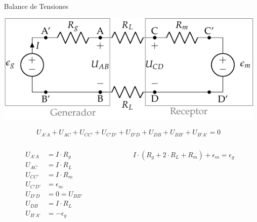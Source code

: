 \documentclass[aspectratio=169, usenames,svgnames,dvipsnames]{beamer}
\begin{document}
\begin{frame}[label={sec:org0779901}]{Balance de Tensiones}
\begin{center}
\includegraphics[height=0.25\textheight]{../figs/circuito_lkv.pdf}
\end{center}
\begin{equation*}
  U_{A'A} + U_{AC} + U_{CC'} + U_{C'D'} + U_{D'D} + U_{DB} + U_{BB'} + U_{B'A'} = 0
\end{equation*}
\begin{columns}
\begin{column}{0.3\columnwidth}
\begin{align*}
  U_{A'A} &= I \cdot R_g\\
  U_{AC} &= I \cdot R_L\\
  U_{CC'} &= I \cdot R_m\\
  U_{C'D'} &= \epsilon_m\\
  U_{D'D} &= 0 = U_{BB'}\\
  U_{DB} &= I \cdot R_L\\
  U_{B'A'} &= -\epsilon_g
\end{align*}
\end{column}
\begin{column}{0.7\columnwidth}
\begin{equation*}
  \boxed{I \cdot (R_g + 2\cdot R_L + R_m) + \epsilon_m = \epsilon_g}
\end{equation*}
\end{column}
\end{columns}
\end{frame}
\end{document}
